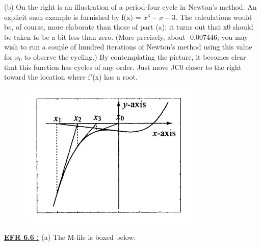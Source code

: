 \documentclass[../main.tex]{subfiles}
\begin{document}
(b) On the right is an illustration of a 
period-four cycle in Newton's method. 
An explicit such example is furnished 
by f(x) = $x^3- x - 3 $. The calculations 
would be, of course, more elaborate 
than those of part (a); it turns out that 
x0 should be taken to be a bit less than 
zero. (More precisely, about -0.007446; 
you may wish to run a couple of 
hundred iterations of Newton's method 
using this value for $x_0$ to observe the 
cycling.) By contemplating the picture, 
it becomes clear that this function has 
cycles of any order. Just move 
JC0 closer to the right toward the 
location where f'(x) has a root. 
\begin{figure}[H]
\includegraphics[width=0.9\linewidth]{43}
	\centering
	\label{pfig:ch13_43}
\end{figure}
\textbf{\underline{EFR 6.6 :}} (a) The M-file is boxed below:
\end{document}
